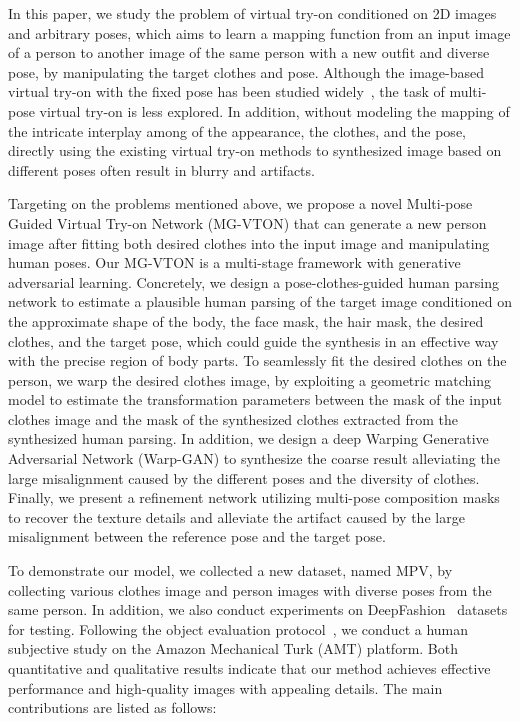 \documentclass[10pt,twocolumn,letterpaper]{article}
\begin{document}
In this paper, we study the problem of virtual try-on conditioned on 2D images and arbitrary poses, which aims to learn a mapping function from an input image of a person to another image of the same person with a new outfit and diverse pose, by manipulating the target clothes and pose. Although the image-based virtual try-on with the fixed pose has been studied widely~\cite{han2017viton,wang2018cpvton,zhu2017fashionGAN}, the task of multi-pose virtual try-on is less explored. In addition, without modeling the mapping of the intricate interplay among of the appearance, the clothes, and the pose, directly using the existing virtual try-on methods to synthesized image based on different poses often result in blurry and artifacts. 

Targeting on the problems mentioned above, we propose a novel Multi-pose Guided Virtual Try-on Network (MG-VTON) that can generate a new person image after fitting both desired clothes into the input image and manipulating human poses. Our MG-VTON is a multi-stage framework with generative adversarial learning. Concretely, we design a pose-clothes-guided human parsing network to estimate a plausible human parsing of the target image conditioned on the approximate shape of the body, the face mask, the hair mask, the desired clothes, and the target pose, which could guide the synthesis in an effective way with the precise region of body parts. To seamlessly fit the desired clothes on the person, we warp the desired clothes image, by exploiting a geometric matching model to estimate the transformation parameters between the mask of the input clothes image and the mask of the synthesized clothes extracted from the synthesized human parsing. In addition, we design a deep Warping Generative Adversarial Network (Warp-GAN) to synthesize the coarse result alleviating the large misalignment caused by the different poses and the diversity of clothes. Finally, we present a refinement network utilizing multi-pose composition masks to recover the texture details and alleviate the artifact caused by the large misalignment between the reference pose and the target pose.

To demonstrate our model, we collected a new dataset, named MPV, by collecting various clothes image and person images with diverse poses from the same person. In addition, we also conduct experiments on DeepFashion~\cite{liu2016deepfashion} datasets for testing. Following the object evaluation protocol~\cite{wang2017pix2pixHD}, we conduct a human subjective study on the Amazon Mechanical Turk (AMT) platform. Both quantitative and qualitative results indicate that our method achieves effective performance and high-quality images with appealing details. The main contributions are listed as follows:
\end{document}

